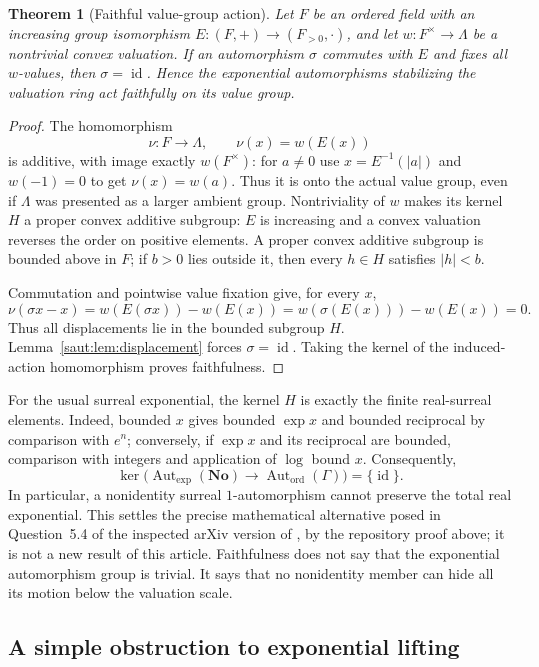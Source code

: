 \documentclass[11pt]{article}
\newtheorem{theorem}{Theorem}[section]
\theoremstyle{definition}
\theoremstyle{remark}
\newcommand{\No}{\mathbf{No}}
\newcommand{\id}{\operatorname{id}}
\newcommand{\Gh}{\operatorname{Aut}_{\mathrm{ord}}(\Gamma)}
\newcommand{\Gexp}{\operatorname{Aut}_{\exp}(\No)}
\numberwithin{equation}{section}
\begin{document}
\begin{theorem}[Faithful value-group action]\label{saut:thm:expfaithful}
Let $F$ be an ordered field with an increasing group isomorphism
$E:(F,+)\to(F_{>0},\cdot)$, and let $w:F^\times\to\Lambda$ be a nontrivial
convex valuation. If an automorphism $\sigma$ commutes with $E$ and fixes
all $w$-values, then $\sigma=\id$.
Hence the exponential automorphisms stabilizing the valuation ring act
faithfully on its value group.
\end{theorem}
\begin{proof}
The homomorphism
\[
 \nu:F\to\Lambda,\qquad \nu(x)=w(E(x))
\]
is additive, with image exactly $w(F^\times)$: for $a\ne0$ use
$x=E^{-1}(|a|)$ and $w(-1)=0$ to get $\nu(x)=w(a)$.
Thus it is onto the actual value group, even if $\Lambda$ was presented
as a larger ambient group. Nontriviality of $w$ makes
its kernel $H$ a proper convex additive
subgroup: $E$ is increasing and a convex valuation reverses the order on
positive elements. A proper convex additive subgroup is bounded above in
$F$; if $b>0$ lies outside it, then every $h\in H$ satisfies $|h|<b$.

Commutation and pointwise value fixation give, for every $x$,
\[
 \nu(\sigma x-x)
 =w(E(\sigma x))-w(E(x))
 =w(\sigma(E(x)))-w(E(x))=0.
\]
Thus all displacements lie in the bounded subgroup $H$.
Lemma~\ref{saut:lem:displacement} forces $\sigma=\id$.
Taking the kernel of the induced-action homomorphism proves faithfulness.
\end{proof}

For the usual surreal exponential, the kernel $H$ is exactly the finite
real-surreal elements. Indeed, bounded $x$ gives bounded $\exp x$ and
bounded reciprocal by comparison with $e^n$; conversely, if $\exp x$ and
its reciprocal are bounded, comparison with integers and application of
$\log$ bound $x$. Consequently,
\begin{equation}\label{saut:eq:expfaithful}
 \ker\bigl(\Gexp\longrightarrow\Gh\bigr)=\{\id\}.
\end{equation}
In particular, a nonidentity surreal $1$-automorphism cannot preserve the
total real exponential. This settles the precise mathematical alternative
posed in Question~5.4 of the inspected arXiv version of \cite{KKS}, by the
repository proof above; it is not a new result of this article.
Faithfulness does not say that the exponential automorphism group is
trivial. It says that no nonidentity member can hide all its motion below
the valuation scale.

\subsection{A simple obstruction to exponential lifting}
\end{document}
